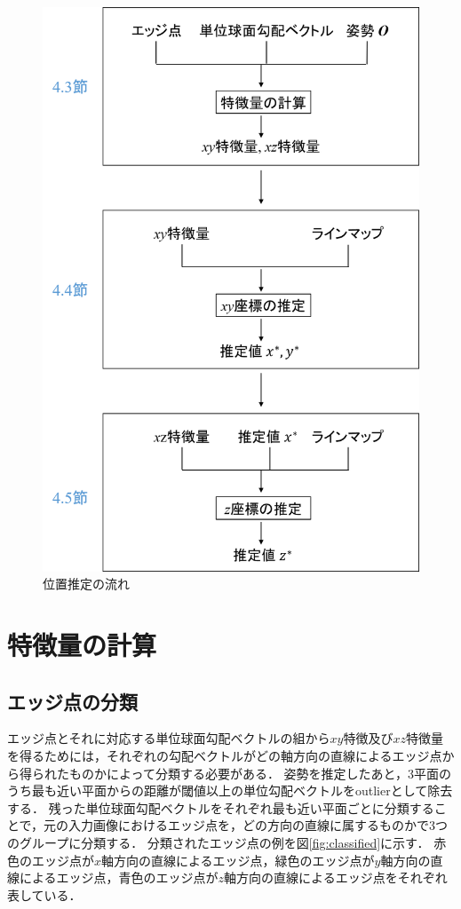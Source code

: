 \begin{figure}[tb]
 \begin{center}
 \includegraphics[width=0.7\columnwidth]{./chap4/fig/flow4.png}
 \vspace{5mm}
 \caption{位置推定の流れ}
 \label{fig:flow4}
 \end{center}
\end{figure}

\clearpage
\section{特徴量の計算}

\subsection{エッジ点の分類}

エッジ点とそれに対応する単位球面勾配ベクトルの組から$xy$特徴及び$xz$特徴量を得るためには，それぞれの勾配ベクトルがどの軸方向の直線によるエッジ点から得られたものかによって分類する必要がある．
姿勢を推定したあと，3平面のうち最も近い平面からの距離が閾値以上の単位勾配ベクトルをoutlierとして除去する．
残った単位球面勾配ベクトルをそれぞれ最も近い平面ごとに分類することで，元の入力画像におけるエッジ点を，どの方向の直線に属するものかで3つのグループに分類する．
分類されたエッジ点の例を図\ref{fig:classified}に示す．
赤色のエッジ点が$x$軸方向の直線によるエッジ点，緑色のエッジ点が$y$軸方向の直線によるエッジ点，青色のエッジ点が$z$軸方向の直線によるエッジ点をそれぞれ表している．
\\

